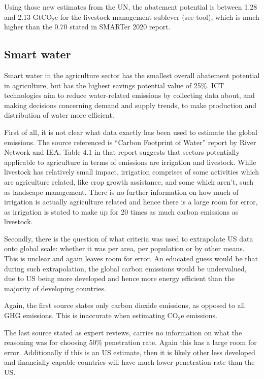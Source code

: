 Using those new estimates from the UN, the abatement potential is between 1.28 and 2.13 GtCO$_2$e for the livestock management sublever (see tool), which is much higher than the 0.70 stated in SMARTer 2020 report.





\subsection{Smart water}

Smart water in the agriculture sector has the smallest overall abatement potential in agriculture, but has the highest savings potential value of 25\%. ICT technologies aim to reduce water-related emissions by collecting data about, and making decisions concerning demand and supply trends, to make production and distribution of water more efficient.

First of all, it is not clear what data exactly has been used to estimate the global emissions. The source referenced is “Carbon Footprint of Water” report by River Network and IEA. Table 4.1 in that report suggests that sectors potentially applicable to agriculture in terms of emissions are irrigation and livestock. While livestock has relatively small impact, irrigation comprises of some activities which are agriculture related, like crop growth assistance, and some which aren’t, such as landscape management. There is no further information on how much of irrigation is actually agriculture related and hence there is a large room for error, as irrigation is stated to make up for 20 times as much carbon emissions as livestock.

Secondly, there is the question of what criteria was used to extrapolate US data onto global scale: whether it was per area, per population or by other means. This is unclear and again leaves room for error. An educated guess would be that during such extrapolation, the global carbon emissions would be undervalued, due to US being more developed and hence more energy efficient than the majority of developing countries.

Again, the first source states only carbon dioxide emissions, as opposed to all GHG emissions. This is inaccurate when estimating CO$_2$e emissions.

The last source stated as expert reviews, carries no information on what the reasoning was for choosing 50\% penetration rate. Again this has a large room for error. Additionally if this is an US estimate, then it is likely other less developed and financially capable countries will have much lower penetration rate than the US.


